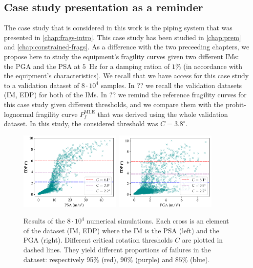     \subsection{Case study presentation as a reminder}

The case study that is considered in this work is the piping system that was presented in \cref{chap:frags-intro}.
This case study has been studied in \cref{chap:prem} and \cref{chap:constrained-frags}. As a difference with the two preceeding chapters, we propose here to study the equipment's fragility curves given two different IMs: the PGA and the PSA at $5$~Hz for a damping ration of $1\%$ (in accordance with the equipment's characteristics). 
We recall that we have access for this case study to a validation dataset of $8\cdot 10^4$ samples.
In ?? we recall the validation datasets (IM, EDP) for both of the IMs. In ?? we remind the reference fragility curves for this case study given different thresholds, and we compare them with the probit-lognormal fragility curve $P_f^{\text{MLE}}$ that was derived  using the whole validation dataset.
In this study, the considered threshold was $C=3.8^\circ$.



\begin{figure}[h]
    \centering%
    \includegraphics[width=5cm]{figures/DoE/cloud_PSA_light.pdf}\ 
    \includegraphics[width=5cm]{figures/DoE/cloud_PGA_light.pdf}%
    \caption{Results of the $8\cdot10^4$ numerical simulations. Each cross is an element of the dataset (IM, EDP) where the IM is the PSA (left) and the PGA (right). Different critical rotation thresholds $C$ are plotted in dashed lines. They yield different proportions of failures in the dataset: respectively 95$\%$ (red), $90\%$ (purple) and $85\%$ (blue).}
    \label{fig:doe:scattersIMs}
    \end{figure}

